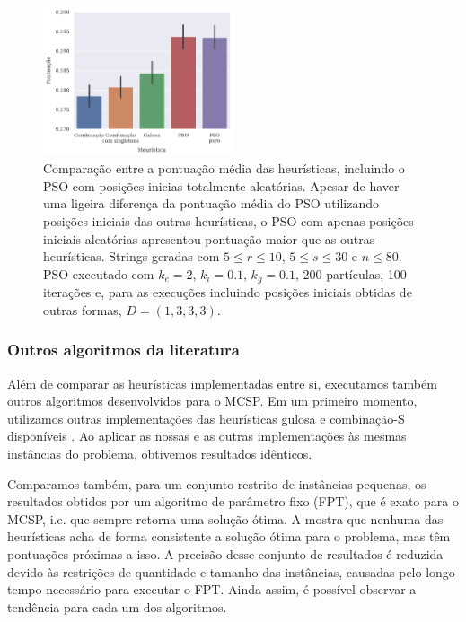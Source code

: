         \begin{figure}[htb]
            \centering
            \includegraphics[width=0.5\textwidth]{images/pso-puro.pdf}
            \caption{Comparação entre a pontuação média das heurísticas, incluindo o PSO com posições inicias totalmente aleatórias. Apesar de haver uma ligeira diferença da pontuação média do PSO utilizando posições iniciais das outras heurísticas, o PSO com apenas posições iniciais aleatórias apresentou pontuação maior que as outras heurísticas. Strings geradas com $5 \leq r \leq 10$, $5 \leq s \leq 30$ e $n \leq 80$. PSO executado com $k_e = 2$, $k_i = 0.1$, $k_g = 0.1$, 200 partículas, 100 iterações e, para as execuções incluindo posições iniciais obtidas de outras formas, $D = (1, 3, 3, 3)$.}
            \label{fig:pso-puro}
        \end{figure}

    \subsubsection{Outros algoritmos da literatura}

        Além de comparar as heurísticas implementadas entre si, executamos também outros algoritmos desenvolvidos para o MCSP. Em um primeiro momento, utilizamos outras implementações das heurísticas gulosa e combinação-S disponíveis \cite{siqueira_signed_2023}. Ao aplicar as nossas e as outras implementações às mesmas instâncias do problema, obtivemos resultados idênticos.

        Comparamos também, para um conjunto restrito de instâncias pequenas, os resultados obtidos por um algoritmo de parâmetro fixo (FPT), que é exato para o MCSP, i.e. que sempre retorna uma solução ótima. A  mostra que nenhuma das heurísticas acha de forma consistente a solução ótima para o problema, mas têm pontuações próximas a isso. A precisão desse conjunto de resultados é reduzida devido às restrições de quantidade e tamanho das instâncias, causadas pelo longo tempo necessário para executar o FPT. Ainda assim, é possível observar a tendência para cada um dos algoritmos.

